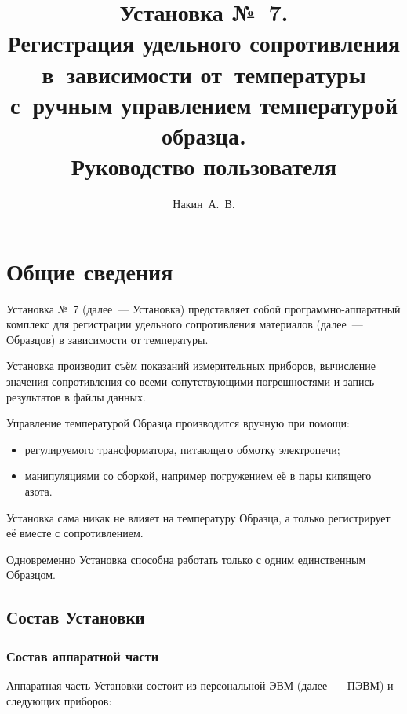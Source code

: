 \documentclass[12pt, a4paper, twocolumn]{report}
\title{Установка №~7. \\ Регистрация удельного сопротивления в~зависимости от~температуры с~ручным управлением температурой образца. \\ Руководство пользователя}
\author{Накин~А.~В.}
\begin{document}
\maketitle

\tableofcontents

\chapter{Общие сведения}

Установка №~7 (далее~--- Установка) представляет собой программно-аппаратный комплекс для регистрации удельного сопротивления материалов (далее~--- Образцов) в зависимости от температуры.

Установка производит съём показаний измерительных приборов, вычисление значения сопротивления со всеми сопутствующими погрешностями и запись результатов в файлы данных.

Управление температурой Образца производится вручную при помощи:

\begin{itemize}
\item регулируемого трансформатора, питающего обмотку электропечи;
\item манипуляциями со сборкой, например погружением её в пары кипящего азота.
\end{itemize}

Установка сама никак не влияет на температуру Образца, а только регистрирует её вместе с сопротивлением.

Одновременно Установка способна работать только с одним единственным Образцом.

\section{Состав Установки}

\subsection{Состав аппаратной части}

Аппаратная часть Установки состоит из персональной ЭВМ (далее~--- ПЭВМ) и следующих приборов:
\end{document}
